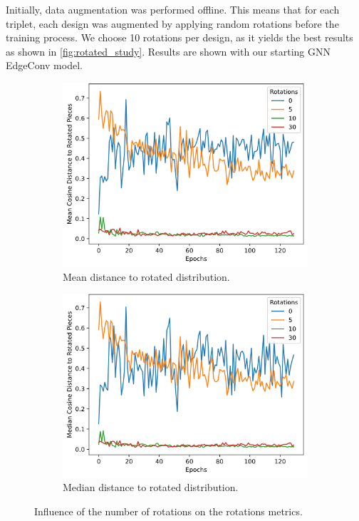 Initially, data augmentation was performed offline. This means that for each triplet, each design was augmented by applying random rotations before the training process. We choose 10 rotations per design, as it yields the best results as shown in \autoref{fig:rotated_study}. Results are shown with our starting GNN EdgeConv model.
\begin{figure}[h]
    \begin{subfigure}[h]{0.5\linewidth}
        \includegraphics[width=\columnwidth]{images/mean_rotated_study.png}
        \caption{Mean distance to rotated distribution.}
        \label{fig:mean_rotated_study}
    \end{subfigure}
    \hfill
    \begin{subfigure}[h]{0.5\linewidth}
        \includegraphics[width=\columnwidth]{images/median_rotated_study.png}
        \caption{Median distance to rotated distribution.}
        \label{fig:median_rotated_study}
    \end{subfigure}
    \caption{Influence of the number of rotations on the rotations metrics.}
    \label{fig:rotated_study}
\end{figure}

